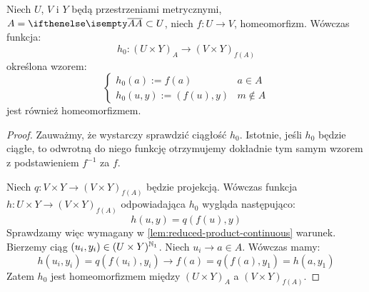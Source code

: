 \begin{lem} \label{lem:reduced-product-homeo}
  Niech $U$, $V$ i $Y$ będą przestrzeniami metrycznymi, $A = \cl A \subset U$, niech  $f: U \to V$, homeomorfizm. Wówczas funkcja:
  \[
    h_0: (U \times Y)_A \to (V \times Y)_{f(A)}
  \]
  określona wzorem:
  \[
    \begin{cases}
      h_0(a) := f(a)& a\in A \\
      h_0(u,y) := (f(u), y)& m\not\in A
    \end{cases}
  \]
  jest również homeomorfizmem.
  \begin{proof}
    Zauważmy, że wystarczy sprawdzić ciągłość $h_0$. Istotnie, jeśli $h_0$ będzie ciągłe, to odwrotną do niego funkcję otrzymujemy dokładnie tym samym wzorem z podstawieniem $f^{-1}$ za $f$.

    Niech $q: V\times Y \to (V\times Y)_{f(A)}$ będzie projekcją. Wówczas funkcja $h: U\times Y \to (V\times Y)_{f(A)}$ odpowiadająca $h_0$ wygląda następująco:
    \[
      h(u,y) = q(f(u),y)
    \]
    Sprawdzamy więc wymagany w \ref{lem:reduced-product-continuous} warunek. Bierzemy ciąg $(u_i, y_i) \in (U\times Y)^{\mathbb{N}_1}$. Niech $u_i \to a \in A$. Wówczas mamy:
    \[
      h(u_i,y_i) = q(f(u_i), y_i) \to f(a) = q(f(a),y_1) = h(a,y_1)
    \]
    Zatem $h_0$ jest homeomorfizmem między $(U \times Y)_A$ a $(V \times Y)_{f(A)}$.
  \end{proof}
\end{lem}

